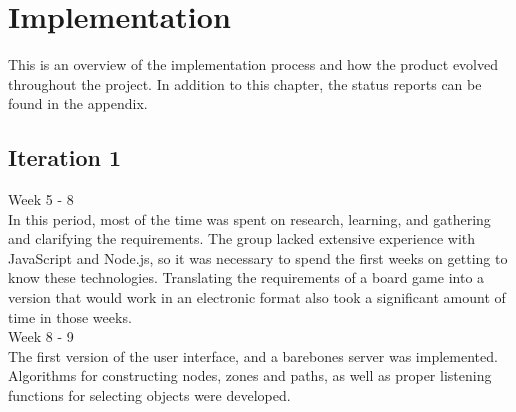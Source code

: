 \chapter{Implementation}

This is an overview of the implementation process and how the product evolved throughout the project. In addition to this chapter, the status reports can be found in the appendix. \\

\section{Iteration 1}

Week 5 - 8\\
\newline
In this period, most of the time was spent on research, learning, and gathering and clarifying the requirements. The group lacked extensive experience with JavaScript and Node.js, so it was necessary to spend the first weeks on getting to know these technologies. Translating the requirements of a board game into a version that would work in an electronic format also took a significant amount of time in those weeks.\\
\newline
Week 8 - 9\\
\newline
The first version of the user interface, and a barebones server was implemented. Algorithms for constructing nodes, zones and paths, as well as proper listening functions for selecting objects were developed.\\

